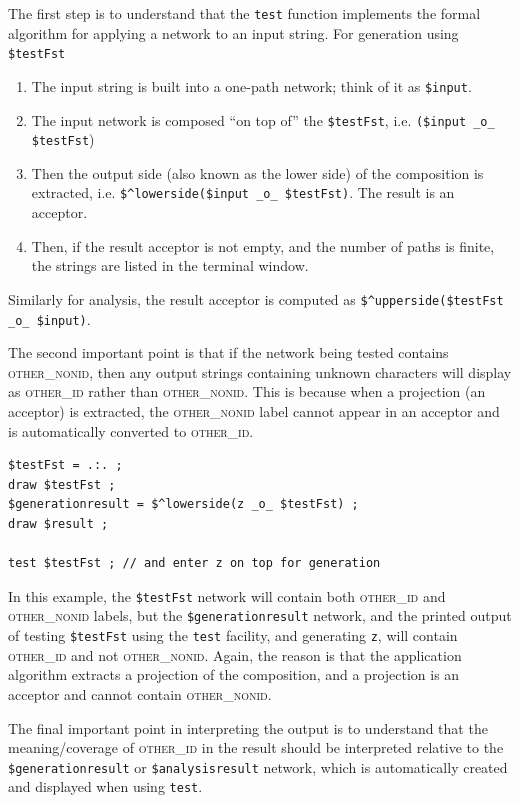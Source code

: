 \documentclass[letterpaper,12pt]{article}
\newcommand{\acro}{\textsc}
\begin{document}
The first step is to understand that the \texttt{test} function implements
the formal algorithm for applying a network to an input string.  For
generation using \verb!$testFst!

\begin{enumerate}
\item
The input string is built into a one-path network; think of it as \verb!$input!.
\item
The input network is composed ``on top of'' the \verb!$testFst!, i.e.\@ 
\verb!($input _o_ $testFst!)
\item
Then the output side (also known as the lower side) of the composition is extracted, i.e.\@
\verb!$^lowerside($input _o_ $testFst)!.  The result is an acceptor. 
\item
Then, if the result acceptor is not empty, and the number of paths is finite, the strings are listed in the
terminal window.
\end{enumerate}

\noindent
Similarly for analysis, the result acceptor is computed as 
\verb!$^upperside($testFst _o_ $input)!.

The second important point is that if the network being tested contains
\acro{other\_nonid}, then any output strings containing unknown characters
will display as \acro{other\_id} rather than \acro{other\_nonid}.  This is
because when a projection (an acceptor) is extracted, the
\acro{other\_nonid} label cannot appear in an acceptor and is
automatically converted to \acro{other\_id}.

\begin{Verbatim}[fontsize=\small]
$testFst = .:. ;
draw $testFst ;
$generationresult = $^lowerside(z _o_ $testFst) ;
draw $result ;

test $testFst ;	// and enter z on top for generation
\end{Verbatim}

\noindent
In this example, the \verb!$testFst! network will contain both
\acro{other\_id} and \acro{other\_nonid} labels, but the
\verb!$generationresult! network, and the printed output of testing
\verb!$testFst! using the \texttt{test} facility, and generating
\texttt{z}, will contain \acro{other\_id} and not \acro{other\_nonid}.
Again, the reason is that the application algorithm extracts a projection
of the composition, and a projection is an acceptor and cannot contain
\acro{other\_nonid}.

The final important point in interpreting the output is to understand
that the meaning/coverage of \acro{other\_id} in the result should be
interpreted relative to the \verb!$generationresult! or
\verb!$analysisresult! network, which is automatically created and
displayed when using \texttt{test}.
\end{document}
